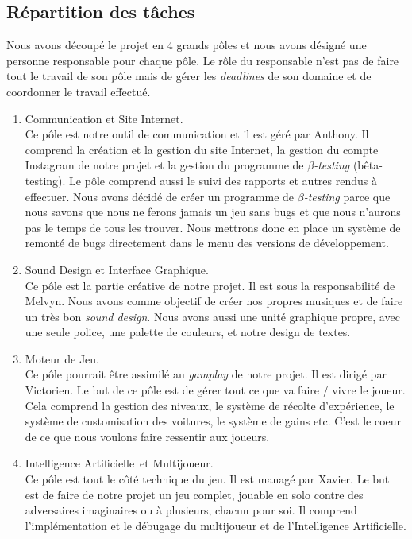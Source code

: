 \documentclass[11pt,a4paper]{article}
\newcommand{\AI}{Intelligence Artificielle}
\begin{document}
  \subsection{Répartition des tâches} 
    Nous avons découpé le projet en 4 grands pôles et nous avons désigné une personne responsable
    pour chaque pôle. Le rôle du responsable n'est pas de faire tout le travail de son pôle mais
    de gérer les \textit{deadlines} de son domaine et de coordonner le travail effectué.
    \begin{enumerate}
      \item Communication et Site Internet.\\
        Ce pôle est notre outil de communication et il est géré par Anthony. Il comprend la création
        et la gestion du site Internet, la gestion du compte Instagram de notre projet \cite{insta} et la
        gestion du programme de \(\beta\)\textit{-testing} (bêta-testing). Le pôle comprend aussi le suivi
        des rapports et autres rendus à effectuer. Nous avons décidé de 
        créer un programme de \(\beta\)\textit{-testing} parce que nous savons que nous ne ferons
        jamais un jeu sans bugs et que nous n'aurons pas le temps de tous les trouver. Nous mettrons
        donc en place un système de remonté de bugs directement dans le menu des versions de développement.
      \item Sound Design et Interface Graphique.\\
        Ce pôle est la partie créative de notre projet. Il est sous la responsabilité de Melvyn.
        Nous avons comme objectif de créer nos propres musiques et de faire un très bon \textit{sound design}.
        Nous avons aussi une unité graphique propre, avec une seule police, une palette de couleurs, et notre
        design de textes.
      \item Moteur de Jeu.\\
        Ce pôle pourrait être assimilé au \textit{gamplay} de notre projet. Il est dirigé par Victorien.
        Le but de ce pôle est de gérer tout ce que va faire / vivre le joueur. Cela comprend la gestion des niveaux,
        le système de récolte d'expérience, le système de customisation des voitures, le système de gains etc. C'est le coeur de ce que nous voulons faire ressentir aux joueurs.
      \item \AI\, et Multijoueur.\\
        Ce pôle est tout le côté technique du jeu. Il est managé par Xavier. Le but est de faire de notre projet
        un jeu complet, jouable en solo contre des adversaires imaginaires ou à plusieurs, chacun pour soi. Il comprend l'implémentation et le débugage du multijoueur et de l'\AI.
    \end{enumerate}
  \clearpage
\end{document}
